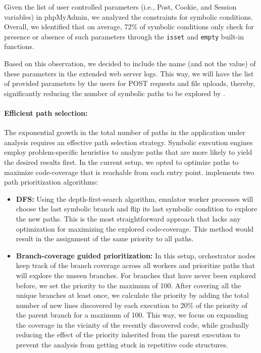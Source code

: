 Given the list of user controlled parameters (i.e., Post, Cookie, and Session variables) in phpMyAdmin, we analyzed the constraints for symbolic conditions. 
Overall, we identified that on average, 72\% of symbolic conditions only check for presence or absence of such parameters through the \texttt{isset} and \texttt{empty} built-in functions. 

Based on this observation, we decided to include the name (and not the value) of these parameters in the extended web server logs. 
This way, we will have the list of provided parameters by the users for POST requests and file uploads, thereby, significantly reducing the number of symbolic paths to be explored by \animatedead{}. 

\paragraph{Efficient path selection:} 
The exponential growth in the total number of paths in the application under analysis requires an effective path selection strategy. 
Symbolic execution engines employ problem-specific heuristics to analyze paths that are more likely to yield the desired results first. 
In the current setup, we opted to optimize paths to maximize code-coverage that is reachable from each entry point. 
\animatedead{} implements two path prioritization algorithms:

\begin{itemize}
    \item \textbf{DFS:} Using the depth-first-search algorithm, emulator worker processes will choose the last symbolic branch and flip its last symbolic condition to explore the new paths. This is the most straightforward approach that lacks any optimization for maximizing the explored code-coverage. 
    This method would result in the assignment of the same priority to all paths.
    \item \textbf{Branch-coverage guided prioritization:} In this setup, orchestrator nodes keep track of the branch coverage across all workers and prioritize paths that will explore the unseen branches. 
    For branches that have never been explored before, we set the priority to the maximum of 100. 
    After covering all the unique branches at least once, we calculate the priority by adding the total number of new lines discovered by each execution to 20\% of the priority of the parent branch for a maximum of 100. 
    This way, we focus on expanding the coverage in the vicinity of the recently discovered code, while gradually reducing the effect of the priority inherited from the parent execution to prevent the analysis from getting stuck in repetitive code structures. 
\end{itemize}

